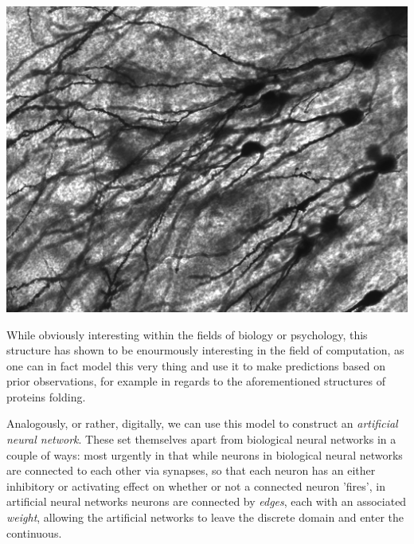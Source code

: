 \begin{Figure}
 \centering
 \includegraphics[width=0.8\linewidth]{images/Gyrus_Dentatus_40x}
\end{Figure}

While obviously interesting within the fields of biology or psychology, this structure has shown 
to be enourmously interesting in the field of computation, as one can in fact model this very 
thing and use it to make predictions based on prior observations, for example in regards to the 
aforementioned structures of proteins folding.

Analogously, or rather, digitally, we can use this model to construct an \textit{artificial 
neural network}.
These set themselves apart from biological neural networks in a couple of ways: most urgently in that while neurons in biological neural networks are connected to each other via synapses, so that each neuron has an either inhibitory or activating effect on whether or not a connected neuron 'fires', in artificial neural networks neurons are connected by \textit{edges}, each with an associated \textit{weight}, allowing the artificial networks to leave the discrete domain and enter the continuous.

